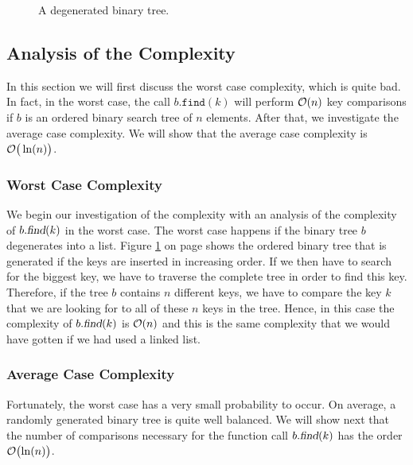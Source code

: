\begin{figure}[!th]
  \centering 
  \caption{A degenerated binary tree.}
  \label{fig:degenerated}
\end{figure}


\subsection{Analysis of the Complexity}
In this section we will first discuss the worst case complexity, which is quite bad.  In fact, in
the worst case, the call $b.\mathtt{find}(k)$ will perform $\mathcal{O}(n)$ key comparisons if $b$ is an ordered
binary search tree of $n$ elements.  After that, we investigate the average case complexity.  We
will show that the average case complexity is $\mathcal{O}\bigr(\ln(n)\bigr)$.

\subsubsection{Worst Case Complexity}
We begin our investigation of the complexity with an analysis of the complexity of $b.\textsl{find}(k)$ 
in the worst case.  The worst case happens if the binary tree $b$ degenerates into a list.
Figure \ref{fig:degenerated} on page \pageref{fig:degenerated} shows the ordered binary tree that
is generated if the keys are inserted in increasing order.  If we then have to search for the
biggest key, we have to traverse the complete tree in order to find this key.  Therefore, if the
tree $b$ contains $n$ different keys, we have to compare the key $k$ that we are looking for to all
of these $n$ keys in the tree.  Hence, in this case the complexity of $b.\textsl{find}(k)$ is 
$\mathcal{O}(n)$ and this is the same complexity that we would have gotten if we had used a linked list.


\subsubsection{Average Case Complexity}
Fortunately, the worst case has a very small probability to occur. On average, a randomly generated
binary tree is quite well balanced.  We will show next that the number of comparisons necessary for
the function call $b.\textsl{find}(k)$ has the order $\mathcal{O}\bigl(\ln(n)\bigr)$.  



